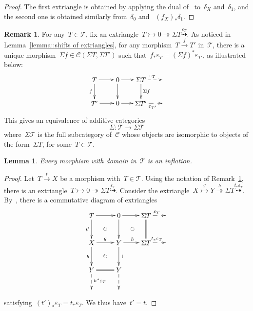 \documentclass{amsart}
\newtheorem{lemma}[theorem]{Lemma}
\theoremstyle{definition}
\newtheorem{remark}[theorem]{Remark}
\newcommand{\cat}{\mathcal{C}}
\newcommand{\susp}{\Sigma}
\newcommand{\tc}{\mathcal{T}}
\newcommand{\infl}{\rightarrowtail}
\newcommand{\defl}{\twoheadrightarrow}
\newcommand{\eps}{\varepsilon}
\begin{document}
\begin{proof}
The first extriangle is obtained by applying the dual of~\cite[Proposition 3.15]{NakaokaPalu} to~$\delta_X$ and~$\delta_1$, and the second one is obtained similarly from~$\delta_0$ and ~$(f_X)_\ast \delta_1$.
\end{proof}

\begin{remark}
\label{remark::equivalence Sigma}
For any~$T\in\tc$, fix an extriangle~$T\infl 0\defl\susp T\overset{\eps_T}{\dashrightarrow}$.
As noticed in Lemma~\ref{lemma::shifts of extriangles}, for any morphism~$T\overset{f}{\to}T'$ in~$\tc$, there is a unique morphism~$\susp f\in\cat(\susp T,\susp T')$ such that~$f_\ast\eps_T=(\susp f)^\ast\eps_{T'}$, as illustrated below:
\[
\xy
(-12,6)*+{T}="0";
(0,6)*+{0}="2";
(12,6)*+{\susp T}="4";
(24,6)*+{}="6";
%
(-12,-6)*+{T'}="10";
(0,-6)*+{0}="12";
(12,-6)*+{\susp T'}="14";
(24,-6)*+{}="16";
%
{\ar "0";"2"};
{\ar "2";"4"};
{\ar@{-->}^{\eps_T} "4";"6"};
%
{\ar_{f} "0";"10"};
{\ar "2";"12"};
{\ar^{\susp f} "4";"14"};
%
{\ar "10";"12"};
{\ar "12";"14"};
{\ar@{-->}_{\eps_{T'}} "14";"16"};
\endxy
\]
This gives an equivalence of additive categories
\[
 \susp: \tc \to \susp\tc
\]
where~$\susp\tc$ is the full subcategory of~$\cat$ whose objects are isomorphic to objects of the form~$\susp T$, for some~$T\in\tc$.
\end{remark}

\begin{lemma}
\label{lemma:: mphs in T are inflations}
Every morphism with domain in~$\tc$ is an inflation.
\end{lemma}

\begin{proof}
Let~$T \overset{t}{\to} X$ be a morphism with~$T\in \tc$.
Using the notation of Remark~\ref{remark::equivalence Sigma}, there is an extriangle~$T\infl 0\defl \susp T \overset{\eps_T}{\dashrightarrow}$.
Consider the extriangle~$X\overset{g}{\infl} Y \overset{h}{\defl} \susp T \overset{t_\ast\eps_T}{\dashrightarrow}$.
By~\cite[Proposition 3.17]{NakaokaPalu}, there is a commutative diagram of extriangles
\[
\xy
(-7,7)*+{T}="2";
(7,7)*+{0}="4";
(21,7)*+{\susp T}="6";
(32,7)*+{}="8";
%
(-7,-7)*+{X}="12";
(7,-7)*+{Y}="14";
(21,-7)*+{\susp T}="16";
(32,-7)*+{}="18";
%
(-7,-21)*+{Y}="22";
(7,-21)*+{Y}="24";
%
(-7,-32)*+{}="32";
(7,-32)*+{}="34";
%
{\ar@{->} "2";"4"};
{\ar@{->} "4";"6"};
{\ar@{-->}^{\eps_T} "6";"8"};
%
{\ar@{->}_{t'} "2";"12"};
{\ar "4";"14"};
{\ar@{=} "6";"16"};
%
{\ar^{g} "12";"14"};
{\ar^{h} "14";"16"};
{\ar@{-->}^{t_\ast\eps_T} "16";"18"};
%
{\ar_{g} "12";"22"};
{\ar^{1} "14";"24"};
%
{\ar@{=} "22";"24"};
%
{\ar@{-->}^{h^\ast\eps_T} "22";"32"};
{\ar@{-->} "24";"34"};
%
{\ar@{}|\circlearrowright "2";"14"};
{\ar@{}|\circlearrowright "4";"16"};
{\ar@{}|\circlearrowright "12";"24"};
\endxy
\]
satisfying~$(t')_\ast\eps_T=t_\ast\eps_T$.
We thus have~$t'=t$.
\end{proof}
\end{document}
